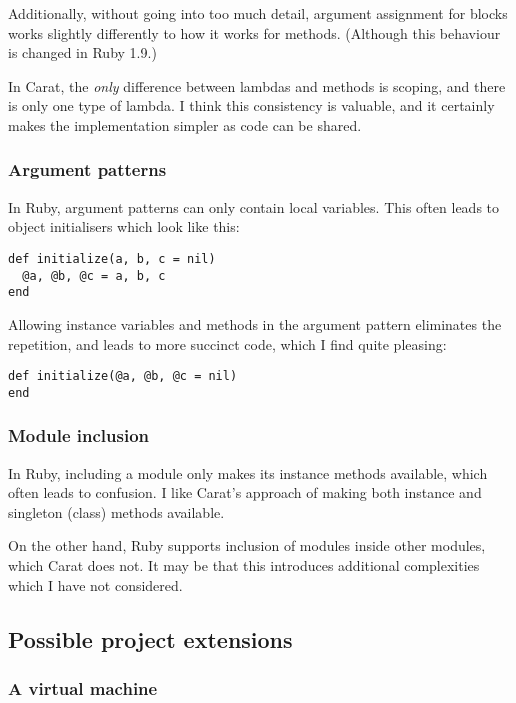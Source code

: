 Additionally, without going into too much detail, argument assignment for blocks works slightly differently to how it works for methods. (Although this behaviour is changed in Ruby 1.9.)

In Carat, the \textit{only} difference between lambdas and methods is scoping, and there is only one type of lambda. I think this consistency is valuable, and it certainly makes the implementation simpler as code can be shared.

\subsubsection{Argument patterns}

In Ruby, argument patterns can only contain local variables. This often leads to object initialisers which look like this:

\begin{lstlisting}
def initialize(a, b, c = nil)
  @a, @b, @c = a, b, c
end
\end{lstlisting}

Allowing instance variables and methods in the argument pattern eliminates the repetition, and leads to more succinct code, which I find quite pleasing:

\begin{lstlisting}
def initialize(@a, @b, @c = nil)
end
\end{lstlisting}

\subsubsection{Module inclusion}

In Ruby, including a module only makes its instance methods available, which often leads to confusion. I like Carat's approach of making both instance and singleton (class) methods available.

On the other hand, Ruby supports inclusion of modules inside other modules, which Carat does not. It may be that this introduces additional complexities which I have not considered.

\subsection{Possible project extensions}

\subsubsection{A virtual machine}

